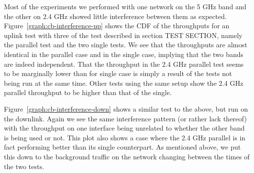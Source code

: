 Most of the experiments we performed with one network on the 5 GHz band and the
other on 2.4 GHz showed little interference between them as expected.
Figure~\ref{graph:cb-interference-up} shows the CDF of the throughputs for an
uplink test with three of the test described in section TEST SECTION, namely   %
the parallel test and the two single tests. We see that the throughputs are
almost identical in the parallel case and in the single case, implying that the
two bands are indeed independent. That the throughput in the 2.4 GHz parallel
test seems to be marginally lower than for single case is simply a result of the
tests not being run at the same time. Other tests using the same setup show the
2.4 GHz parallel throughput to be higher than that of the single.

Figure~\ref{graph:cb-interference-down} shows a similar test to the above, but
run on the downlink. Again we see the same interference pattern (or rather lack
thereof) with the throughput on one interface being unrelated to whether the
other band is being used or not. This plot also shows a case where the 2.4 GHz
parallel is in fact performing better than its single counterpart. As mentioned
above, we put this down to the background traffic on the network changing
between the times of the two tests.

